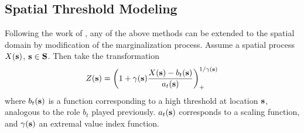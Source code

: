 \subsection{Spatial Threshold Modeling}
Following the work of \cite{ferreira2014}, any of the above methods can be
  extended to the spatial domain by modification of the marginalization process.
  Assume a spatial process $X({\bf s})$, ${\bf s}\in {\bf S}$.  Then take the
  transformation
\begin{equation}
  \label{eqn:spatial}
  Z({\bf s}) = \left(1 + \gamma({\bf s})\frac{X({\bf s}) - b_t({\bf s})}{a_t({\bf s})}\right)_{+}^{1/{\gamma({\bf s})}}
\end{equation}
  where $b_t({\bf s})$ is a function corresponding to a high threshold at location
  ${\bf s}$, analogous to the role $b_t$ played previously. $a_t({\bf s})$
  corresponds to a scaling function, and $\gamma({\bf s})$ an extremal value index
  function.

